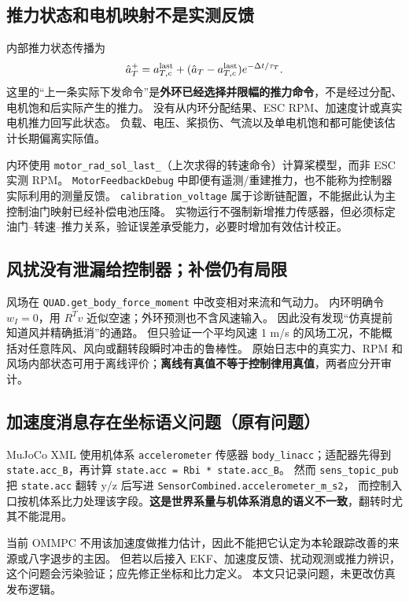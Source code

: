 \documentclass[UTF8,a4paper,11pt,fontset=fandol]{ctexart}
\newcommand{\code}[1]{{\small\nolinkurl{#1}}}
\begin{document}
\subsection{推力状态和电机映射不是实测反馈}
内部推力状态传播为
\begin{equation}
 \hat a_T^+=a_{T,c}^{\rm last}+
 (\hat a_T-a_{T,c}^{\rm last})e^{-\Delta t/\tau_T}.
\end{equation}
这里的“上一条实际下发命令”是\textbf{外环已经选择并限幅的推力命令}，不是经过分配、电机饱和后实际产生的推力。
没有从内环分配结果、ESC RPM、加速度计或真实电机推力回写此状态。
负载、电压、桨损伤、气流以及单电机饱和都可能使该估计长期偏离实际值。

内环使用 \code{motor_rad_sol_last_}（上次求得的转速命令）计算桨模型，而非 ESC 实测 RPM。
\code{MotorFeedbackDebug} 中即便有遥测/重建推力，也不能称为控制器实际利用的测量反馈。
\code{calibration_voltage} 属于诊断链配置，不能据此认为主控制油门映射已经补偿电池压降。
实物运行不强制新增推力传感器，但必须标定油门--转速--推力关系，验证误差承受能力，必要时增加有效估计校正。

\subsection{风扰没有泄漏给控制器；补偿仍有局限}
风场在 \code{QUAD.get_body_force_moment} 中改变相对来流和气动力。
内环明确令 $w_I=0$，用 $R^Tv$ 近似空速；外环预测也不含风速输入。
因此没有发现“仿真提前知道风并精确抵消”的通路。
但只验证一个平均风速 1 m/s 的风场工况，不能概括对任意阵风、风向或翻转段瞬时冲击的鲁棒性。
原始日志中的真实力、RPM 和风场内部状态可用于离线评价；\textbf{离线有真值不等于控制律用真值}，两者应分开审计。

\subsection{加速度消息存在坐标语义问题（原有问题）}
MuJoCo XML 使用机体系 \code{accelerometer} 传感器 \code{body_linacc}；适配器先得到
\code{state.acc_B}，再计算 \code{state.acc = Rbi * state.acc_B}。
然而 \code{sens_topic_pub} 把 \code{state.acc} 翻转 y/z 后写进 \code{SensorCombined.accelerometer_m_s2}，
而控制入口按机体系比力处理该字段。\textbf{这是世界系量与机体系消息的语义不一致}，翻转时尤其不能混用。

当前 OMMPC 不用该加速度做推力估计，因此不能把它认定为本轮跟踪改善的来源或八字退步的主因。
但若以后接入 EKF、加速度反馈、扰动观测或推力辨识，这个问题会污染验证；应先修正坐标和比力定义。
本文只记录问题，未更改仿真发布逻辑。
\end{document}

